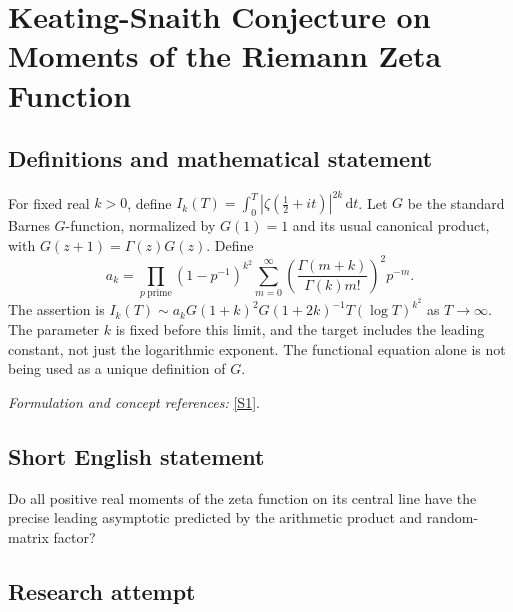 \documentclass[11pt,a4paper]{article}
\newcommand{\dd}{\,\mathrm d}
\newcommand{\sref}[2]{\hyperlink{source:#1:#2}{[S#2]}}
\newif\ifshowcatalogue
\newcommand{\cataloguescope}[1]{\ifshowcatalogue
 \paragraph{Exact scope in the supplied catalogue.}
 \begin{quote}\small #1\end{quote}\fi}
\numberwithin{equation}{section}
\begin{document}
\setcounter{section}{0}
\clearpage
\section*{\texorpdfstring{Keating-Snaith Conjecture on Moments of the Riemann Zeta Function}{Keating-Snaith Conjecture on Moments of the Riemann Zeta Function}}\label{statement}
\subsection{Definitions and mathematical statement}
For fixed real $k>0$, define $I_k(T)=\int_0^T|\zeta(\tfrac12+it)|^{2k}\dd t$. Let $G$ be the standard Barnes $G$-function, normalized by $G(1)=1$ and its usual canonical product, with $G(z+1)=\Gamma(z)G(z)$. Define
\[
 a_k=\prod_{p\ \mathrm{prime}}(1-p^{-1})^{k^2}
 \sum_{m=0}^{\infty}\left(\frac{\Gamma(m+k)}{\Gamma(k)m!}\right)^2p^{-m}.
\]
The assertion is
$I_k(T)\sim a_kG(1+k)^2G(1+2k)^{-1}T(\log T)^{k^2}$ as $T\to\infty$. The parameter $k$ is fixed before this limit, and the target includes the leading constant, not just the logarithmic exponent. The functional equation alone is not being used as a unique definition of $G$.
\par\smallskip\textit{Formulation and concept references:} \sref{statement}{1}.
\cataloguescope{For every fixed real k>0, let I\_k(T)=integral\_0\textasciicircum{}T |zeta(1/2+it)|\textasciicircum{}(2k) dt. Prove that I\_k(T) is asymptotic to a\_k G(1+k)\textasciicircum{}2/G(1+2k) times T(log T)\textasciicircum{}(k\textasciicircum{}2), where G is the Barnes G-function and a\_k=product\_p (1-1/p)\textasciicircum{}(k\textasciicircum{}2) sum\_(m>=0) (Gamma(m+k)/(Gamma(k)m!))\textasciicircum{}2 p\textasciicircum{}(-m).}
\subsection{Short English statement}
Do all positive real moments of the zeta function on its central line have the precise leading asymptotic predicted by the arithmetic product and random-matrix factor?
\subsection{Research attempt}
\end{document}
